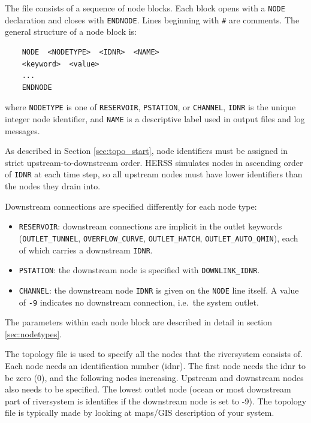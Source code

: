 \documentclass[a4paper, 12pt]{report}
\begin{document}
	The file consists of a sequence of node blocks. Each block opens with a \texttt{NODE}
	declaration and closes with \texttt{ENDNODE}. Lines beginning with \texttt{\#} are
	comments. The general structure of a node block is:

	\begin{verbatim}
	NODE  <NODETYPE>  <IDNR>  <NAME>
	<keyword>  <value>
	...
	ENDNODE
	\end{verbatim}

	where \texttt{NODETYPE} is one of \texttt{RESERVOIR}, \texttt{PSTATION}, or
	\texttt{CHANNEL}, \texttt{IDNR} is the unique integer node identifier, and \texttt{NAME}
	is a descriptive label used in output files and log messages.

	As described in Section \ref{sec:topo_start}, node identifiers must be assigned in
	strict upstream-to-downstream order. HERSS simulates nodes in ascending order of
	\texttt{IDNR} at each time step, so all upstream nodes must have lower identifiers than the nodes they drain into.

	Downstream connections are specified differently for each node type:

	\begin{itemize}
	\item \texttt{RESERVOIR}: downstream connections are implicit in the outlet
	keywords (\texttt{OUTLET\_TUNNEL}, \texttt{OVERFLOW\_CURVE},
	\texttt{OUTLET\_HATCH}, \texttt{OUTLET\_AUTO\_QMIN}), each of which
	carries a downstream \texttt{IDNR}.
	\item \texttt{PSTATION}: the downstream node is specified with
	\texttt{DOWNLINK\_IDNR}.
	\item \texttt{CHANNEL}: the downstream node \texttt{IDNR} is given on the
	\texttt{NODE} line itself. A value of \texttt{-9} indicates no downstream
	connection, i.e.\ the system outlet.
	\end{itemize}


	The parameters within each node block are described in detail in section \ref{sec:nodetypes}.

	The topology file is used to specify all the nodes that the riversystem consists of. Each node needs an identification number (idnr). The first node needs the idnr to be zero (0), and the following nodes increasing. Upstream and downstream nodes also needs to be specified. The lowest outlet node (ocean or most downstream part of riversystem is identifies if the downstream node is set to -9). The topology file is typically 
	made by looking at maps/GIS description of your system. 
\end{document}

